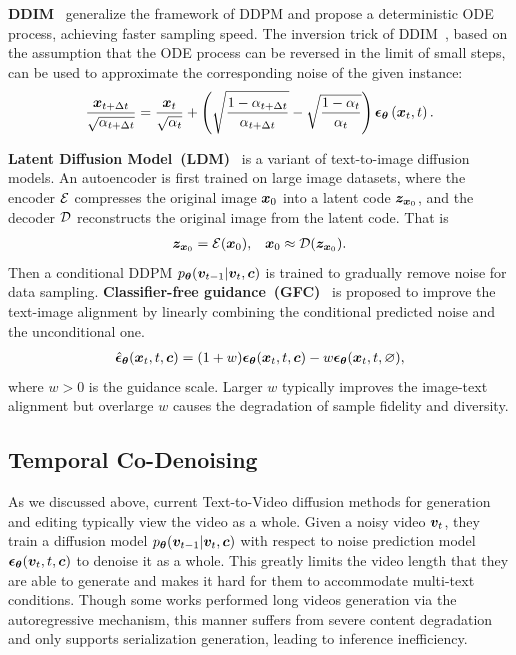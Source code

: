 \documentclass{article}
\begin{document}
\textbf{DDIM}~\cite{song2020denoising} generalize the framework of DDPM and propose a deterministic ODE process, achieving faster sampling speed. The inversion trick of DDIM~\cite{mokady2022null}, based on the assumption that the ODE process can be reversed in the limit of small steps, can be used to approximate the corresponding noise of the given instance:
\begin{align*}
    \frac{{\bm{x}}_{t+\Delta t}}{\sqrt{\alpha_{t+\Delta t}}}=\frac{{\bm{x}}_t}{\sqrt{\alpha_t}}+\left(\sqrt{\frac{1-\alpha_{t+\Delta t}}{\alpha_{t+\Delta t}}}-\sqrt{\frac{1-\alpha_t}{\alpha_t}}\right) {\bm{\epsilon}}_{\bm{\theta}}\left({\bm{x}}_t,t\right).
\end{align*}


\textbf{Latent Diffusion Model~(LDM)}~\cite{rombach2022high} is a variant of text-to-image diffusion models. An autoencoder is first trained on large image datasets, where the encoder ${\mathcal{E}}$ compresses the original image ${\bm{x}}_0$ into a latent code ${\bm{z}}_{{\bm{x}}_0}$, and the decoder ${\mathcal{D}}$ reconstructs the original image from the latent code. That is 
\begin{align*}
    &{\bm{z}}_{{\bm{x}}_0} = {\mathcal{E}}({\bm{x}}_0), & {\bm{x}}_0\approx {\mathcal{D}}({\bm{z}}_{{\bm{x}}_0}).
\end{align*}
Then a conditional DDPM $p_{\bm{\theta}}({\bm{v}}_{t-1}|{\bm{v}}_{t},{\bm{c}})$ is trained to gradually remove noise for data sampling.
\textbf{Classifier-free guidance~(GFC)}~\cite{ho2021classifier} is proposed to improve the text-image alignment by linearly combining the conditional predicted noise and the unconditional one.
\begin{align*}
\hat{{\bm{\epsilon}}}_{\bm{\theta}}({\bm{x}}_t,t,{\bm{c}}) = (1+w){\bm{\epsilon}}_{\bm{\theta}}({\bm{x}}_t,t,{\bm{c}})-w{\bm{\epsilon}}_{\bm{\theta}}({\bm{x}}_t,t,\varnothing),
\end{align*}
where $w > 0$ is the guidance scale. Larger $w$ typically improves the image-text alignment but overlarge $w$ causes the degradation of sample fidelity and diversity.
\subsection{Temporal Co-Denoising}\label{sec:temporal co-denoising}

As we discussed above, current Text-to-Video diffusion methods for generation and editing typically view the video as a whole. Given a noisy video ${\bm{v}}_{t}$, they train a diffusion model $p_{\bm{\theta}}({\bm{v}}_{t-1}|{\bm{v}}_{t},{\bm{c}})$ with respect to noise prediction model ${\bm{\epsilon}}_{\bm{\theta}}({\bm{v}}_{t},t,{\bm{c}})$ to denoise it as a whole.
This greatly limits the video length that they are able to generate and makes it hard for them to accommodate multi-text conditions. 
Though some works performed long videos generation via the autoregressive mechanism, this manner suffers from severe content degradation and only supports serialization generation, leading to inference inefficiency. 
\end{document}
